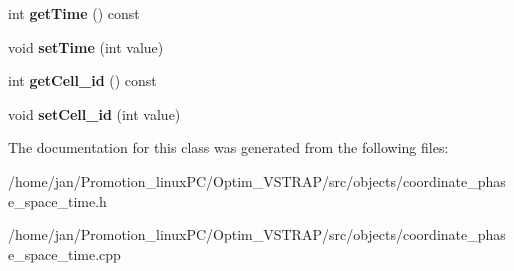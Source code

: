 \begin{DoxyCompactItemize}
int {\bfseries get\+Time} () const
\item 
\mbox{\label{classcoordinate__phase__space__time_abe1a9b1873abb56bd3b35ec02632a0f4}} 
void {\bfseries set\+Time} (int value)
\item 
\mbox{\label{classcoordinate__phase__space__time_a9ffc018c776d0d51405525ffa6006f53}} 
int {\bfseries get\+Cell\+\_\+id} () const
\item 
\mbox{\label{classcoordinate__phase__space__time_af36e24dd8c68d9a8b1e2ca3dd370de02}} 
void {\bfseries set\+Cell\+\_\+id} (int value)
\end{DoxyCompactItemize}


The documentation for this class was generated from the following files\+:\begin{DoxyCompactItemize}
\item 
/home/jan/\+Promotion\+\_\+linux\+P\+C/\+Optim\+\_\+\+V\+S\+T\+R\+A\+P/src/objects/coordinate\+\_\+phase\+\_\+space\+\_\+time.\+h\item 
/home/jan/\+Promotion\+\_\+linux\+P\+C/\+Optim\+\_\+\+V\+S\+T\+R\+A\+P/src/objects/coordinate\+\_\+phase\+\_\+space\+\_\+time.\+cpp\end{DoxyCompactItemize}
